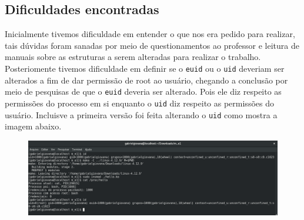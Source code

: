 \documentclass[12pt]{article}
\begin{document}
\subsection*{Dificuldades encontradas}
    Inicialmente tivemos dificuldade em entender o que nos era pedido
    para realizar, tais dúvidas foram sanadas por meio de
    questionamentos ao professor e leitura de manuais sobre as estruturas
    a serem alteradas para realizar o trabalho. Posteriomente tivemos dificuldade
    em definir se o \texttt{euid} ou o \texttt{uid} deveriam ser alterados
    a fim de dar permissão de root ao usuário, chegando a conclusão por meio
    de pesquisas de que o \texttt{euid} deveria ser alterado. Pois ele diz respeito
    as permissões do processo em si enquanto o \texttt{uid} diz respeito as
    permissões do usuário. Incluisve a primeira versão foi feita alterando o
    \texttt{uid} como mostra a imagem abaixo.
    \newline

    \begin{figure}[h]
      \includegraphics[width=\textwidth]{print}
      \centering
    \end{figure}
\end{document}
